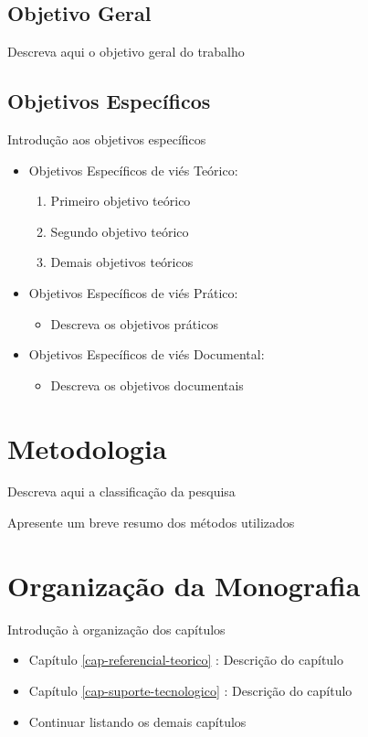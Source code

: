 \subsection{Objetivo Geral}
\label{1-objetivos-gerais}
Descreva aqui o objetivo geral do trabalho

\subsection{Objetivos Específicos}
\label{1-objetivos-especificos}
Introdução aos objetivos específicos

\begin{itemize}
	\item Objetivos Específicos de viés Teórico:
	\begin{enumerate}
		\item Primeiro objetivo teórico
		\item Segundo objetivo teórico
		\item Demais objetivos teóricos
	\end{enumerate}
	\item Objetivos Específicos de viés Prático:
	\begin{itemize}
		\item Descreva os objetivos práticos
	\end{itemize}
	\item Objetivos Específicos de viés Documental:
	\begin{itemize}
		\item Descreva os objetivos documentais
	\end{itemize}
\end{itemize}

\section{Metodologia}
\label{1-metodologia}
Descreva aqui a classificação da pesquisa

Apresente um breve resumo dos métodos utilizados

\section{Organização da Monografia}
\label{1-organizacao}
Introdução à organização dos capítulos

\begin{itemize}
	\item Capítulo \ref{cap-referencial-teorico} : Descrição do capítulo
	\item Capítulo \ref{cap-suporte-tecnologico} : Descrição do capítulo
	\item Continuar listando os demais capítulos
\end{itemize}
